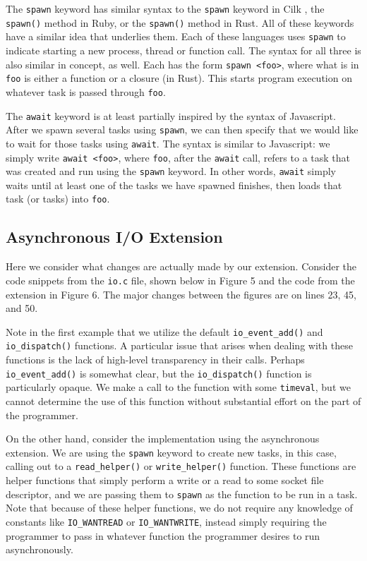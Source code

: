 \documentclass[main.tex]{subfiles}
\begin{document}
The \verb|spawn| keyword has similar syntax to the \verb|spawn| keyword in Cilk \cite{2}, the \verb|spawn()| method in
Ruby, or the \verb|spawn()| method in Rust. All of these keywords have a similar idea that underlies them. Each of
these languages uses \verb|spawn| to indicate starting a new process, thread or function call. The syntax for all three is
also similar in concept, as well. Each has the form \verb|spawn <foo>|, where what is in \verb|foo| is either a function or
a closure (in Rust). This starts program execution on whatever task is passed through \verb|foo|.

The \verb|await| keyword is at least partially inspired by the syntax of Javascript. After we spawn several tasks using
\verb|spawn|, we can then specify that we would like to wait for those tasks using \verb|await|. The syntax is similar to
Javascript: we simply write \verb|await <foo>|, where \verb|foo|, after the \verb|await| call, refers to a task that was created and
run using the \verb|spawn| keyword. In other words, \verb|await| simply waits until at least one of the tasks we have spawned
finishes, then loads that task (or tasks) into \verb|foo|.

\subsection{Asynchronous I/O Extension}
Here we consider what changes are actually made by our extension. Consider the code snippets from the \verb|io.c| file, shown below
in Figure 5 and the code from the extension in Figure 6. The major changes between the figures are on lines 23, 45, and 50.

Note in the first example that we utilize the default \verb|io_event_add()| and \verb|io_dispatch()| functions. A particular
issue that arises when dealing with these functions is the lack of high-level transparency in their calls. Perhaps 
\verb|io_event_add()| is somewhat clear, but the \verb|io_dispatch()| function is particularly opaque. We make a call to the
function with some \verb|timeval|, but we cannot determine the use of this function without substantial effort on the part of the
programmer. 

On the other hand, consider the implementation using the asynchronous extension. We are using the
\verb|spawn| keyword to create new tasks, in this case, calling out to a \verb|read_helper()| or \verb|write_helper()| function. These
functions are helper functions that simply perform a write or a read to some socket file descriptor, and we are passing them to 
\verb|spawn| as the function to be run in a task. Note that because of these helper functions, we do not require any knowledge of
constants like \verb|IO_WANTREAD| or \verb|IO_WANTWRITE|, instead simply requiring the programmer to pass in whatever function
the programmer desires to run asynchronously.
\end{document}
